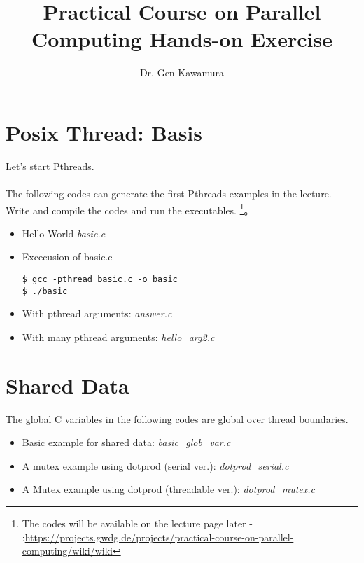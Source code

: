 \documentclass{article} \usepackage{listings}
\title{Practical Course on Parallel Computing  Hands-on Exercise}
\author{Dr. Gen Kawamura}
\begin{document}
\maketitle





\section{Posix Thread: Basis}
Let's start Pthreads.\\ 
\\
The following codes can generate the first Pthreads examples in the lecture. Write and compile the codes and run the executables.
\footnote{The codes will be available on the lecture page later - :\url{https://projects.gwdg.de/projects/practical-course-on-parallel-computing/wiki/wiki}}。\\

\begin{itemize}
\item Hello World {\it basic.c}


\item Excecusion of basic.c
\begin{lstlisting}
$ gcc -pthread basic.c -o basic 
$ ./basic
\end{lstlisting}


\item With pthread arguments: {\it answer.c}


\item With many pthread arguments: {\it hello\_arg2.c}


\end{itemize}


\section{Shared Data}
The global C variables in the following codes are global over thread boundaries.

\begin{itemize}

\item Basic example for shared data: {\it basic\_glob\_var.c}


\item A mutex example using dotprod (serial ver.): {\it dotprod\_serial.c}


\item A Mutex example using dotprod (threadable ver.): {\it dotprod\_mutex.c}


\end{itemize}
\end{document}
